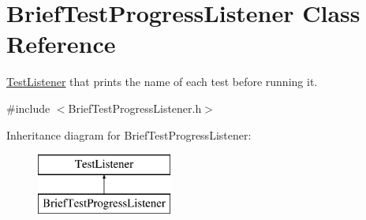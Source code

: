 \hypertarget{class_brief_test_progress_listener}{}\section{Brief\+Test\+Progress\+Listener Class Reference}
\label{class_brief_test_progress_listener}


\hyperlink{class_test_listener}{Test\+Listener} that prints the name of each test before running it.  




{\ttfamily \#include $<$Brief\+Test\+Progress\+Listener.\+h$>$}

Inheritance diagram for Brief\+Test\+Progress\+Listener\+:\begin{figure}[H]
\begin{center}
\leavevmode
\includegraphics[height=2.000000cm]{class_brief_test_progress_listener}
\end{center}
\end{figure}
